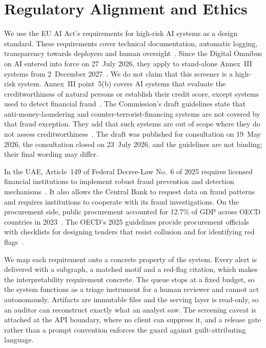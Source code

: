 \documentclass[conference]{IEEEtran}
\begin{document}
\section{Regulatory Alignment and Ethics}
\label{sec:regulatory}

We use the EU AI Act's requirements for high-risk AI systems as a design
standard. These requirements cover technical documentation, automatic logging,
transparency towards deployers and human oversight~\cite[Arts.~11--14]{aiact}.
Since the Digital Omnibus on AI entered into force on 27~July 2026, they apply
to stand-alone Annex~III systems from 2~December 2027~\cite{omnibus}. We do not
claim that this screener is a high-risk system. Annex~III point~5(b) covers AI
systems that evaluate the creditworthiness of natural persons or establish
their credit score, except systems used to detect financial
fraud~\cite{aiact}. The Commission's draft guidelines state that anti-money-laundering and
counter-terrorist-financing systems are not covered by that fraud exception.
They add that such systems are out of scope where they do not assess
creditworthiness~\cite[para.~309]{eccguidance}. The draft was
published for consultation on 19~May 2026, the consultation closed on 23~July
2026, and the guidelines are not binding; their final wording may differ.

In the UAE, Article~149 of Federal Decree-Law No.~6 of 2025 requires licensed
financial institutions to implement robust fraud prevention and detection
mechanisms~\cite{uaefdl2025}. It also allows the Central Bank to request data on
fraud patterns and requires institutions to cooperate with its fraud
investigations. On the procurement side, public procurement accounted for 12.7\% of GDP across
OECD countries in 2023~\cite[p.~146]{oecdgaag2025}. The OECD's 2025 guidelines
provide procurement officials with checklists for designing tenders that resist
collusion and for identifying red flags~\cite{oecd2025}.

We map each requirement onto a concrete property of the system. Every alert is
delivered with a subgraph, a matched motif and a red-flag citation, which makes
the interpretability requirement concrete. The queue stops at a fixed budget,
so the system functions as a triage instrument for a human reviewer and cannot
act autonomously. Artifacts are immutable files and the serving layer is
read-only, so an auditor can reconstruct exactly what an analyst saw. The
screening caveat is attached at the API boundary, where no client can suppress
it, and a release gate rather than a prompt convention enforces the guard
against guilt-attributing language.
\end{document}
